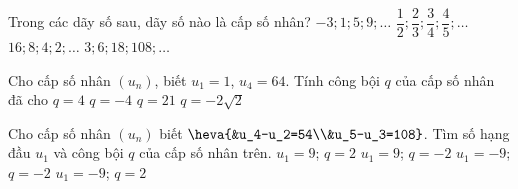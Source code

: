 

\begin{ex}%
	Trong các dãy số sau, dãy  số nào là cấp số nhân?
	\choice 
		{$-3; 1; 5; 9; \ldots$} 
		{$\dfrac{1}{2}; \dfrac{2}{3}; \dfrac{3}{4};  \dfrac{4}{5}; \ldots$}
		{\True $16; 8; 4;  2; \ldots$}
		{$3; 6; 18; 108; \ldots$} 
\end{ex}

\begin{ex}%
	Cho cấp số nhân $\left(u_n\right)$, biết $u_1=1$,  $u_4=64$. Tính công bội $q$ của cấp số nhân đã cho
	\choice 
		{\True  $q=4$}
		{$q=-4$} 
		 {$q=21$}
		{$q=-2\sqrt{2}$} 
\end{ex}

\begin{ex}%
	Cho cấp số nhân $(u_n)$ biết $\heva{&u_4-u_2=54\\&u_5-u_3=108}$. Tìm số hạng đầu $u_1$ và công bội $q$ của  cấp số nhân trên.
	 \choice
		{\True $u_1=9$;  $q=2$}
		{$u_1=9$;  $q=-2$}
		{$u_1=-9$;  $q=-2$}
		{$u_1=-9$;  $q=2$}
\end{ex}

